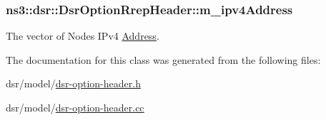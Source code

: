 \subsubsection[{\texorpdfstring{m\+\_\+ipv4\+Address}{m_ipv4Address}}]{ ns3\+::dsr\+::\+Dsr\+Option\+Rrep\+Header\+::m\+\_\+ipv4\+Address\hspace{0.3cm}{\ttfamily [private]}}\hypertarget{classns3_1_1dsr_1_1DsrOptionRrepHeader_a42818ebd088a2edcdda07b8ed43e4708}{}\label{classns3_1_1dsr_1_1DsrOptionRrepHeader_a42818ebd088a2edcdda07b8ed43e4708}


The vector of Nodes\textquotesingle{} I\+Pv4 \hyperlink{classns3_1_1Address}{Address}. 



The documentation for this class was generated from the following files\+:\begin{DoxyCompactItemize}
\item 
dsr/model/\hyperlink{dsr-option-header_8h}{dsr-\/option-\/header.\+h}\item 
dsr/model/\hyperlink{dsr-option-header_8cc}{dsr-\/option-\/header.\+cc}\end{DoxyCompactItemize}
